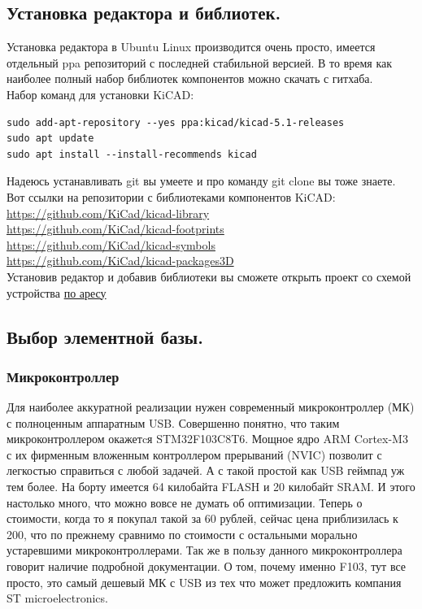 \documentclass[12pt,a4paper]{article}
\begin{document}
\subsection{Установка редактора и библиотек.}
    Установка редактора в Ubuntu Linux производится очень просто, имеется
    отдельный ppa репозиторий с последней стабильной версией. В то время как
    наиболее полный набор библиотек компонентов можно скачать с гитхаба.\\
    Набор команд для установки KiCAD:
\lstset{language=bash}           %
\begin{lstlisting}
sudo add-apt-repository --yes ppa:kicad/kicad-5.1-releases
sudo apt update
sudo apt install --install-recommends kicad
\end{lstlisting}
    Надеюсь устанавливать git вы умеете и про команду git clone вы тоже знаете.
    Вот ссылки на репозитории с библиотеками компонентов KiCAD:\\
    \url{https://github.com/KiCad/kicad-library}\\
    \url{https://github.com/KiCad/kicad-footprints}\\
    \url{https://github.com/KiCad/kicad-symbols}\\
    \url{https://github.com/KiCad/kicad-packages3D}\\
    Установив редактор и добавив библиотеки вы сможете открыть проект со схемой
    устройства
    \href{https://github.com/dltech/usb_device3/tree/main/sch}{по аресу}
\subsection{Выбор элементной базы.}
\subsubsection{Микроконтроллер}
    Для наиболее аккуратной реализации нужен современный микроконтроллер (МК) с
    полноценным аппаратным USB. Совершенно понятно, что таким микроконтроллером
    окажетcя STM32F103C8T6. Мощное ядро ARM Cortex-M3 с их фирменным вложенным
    контроллером прерываний (NVIC) позволит с легкостью справиться с любой
    задачей. А с такой простой как USB геймпад уж тем более. На борту имеется
    64 килобайта FLASH и 20 килобайт SRAM. И этого настолько много, что можно
    вовсе не думать об оптимизации. Теперь о стоимости, когда то я покупал такой
    за 60 рублей, сейчас цена приблизилась к 200, что по прежнему сравнимо по
    стоимости с остальными морально устаревшими микроконтроллерами. Так же в
    пользу данного микроконтроллера говорит наличие подробной
    документации. О том, почему именно F103, тут все просто, это самый дешевый
    МК с USB из тех что может предложить компания ST microelectronics.
\end{document}
